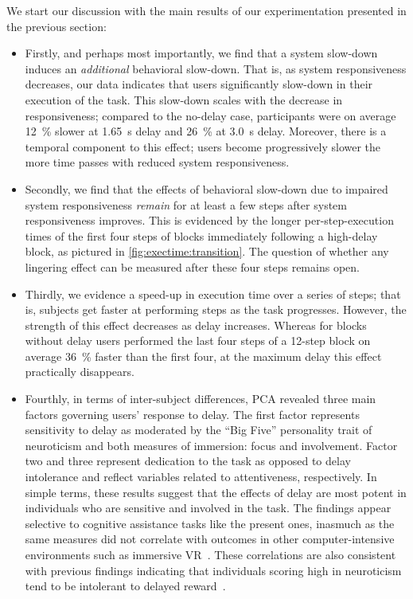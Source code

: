 We start our discussion with the main results of our experimentation presented in the previous section:

\begin{itemize}
  \item Firstly, and perhaps most importantly, we find that a system slow-down induces an \textit{additional} behavioral slow-down.
  That is, as system responsiveness decreases, our data indicates that users significantly slow-down in their execution of the task.
  This slow-down scales with the decrease in responsiveness; compared to the no-delay case, participants were on average \SI{12}{\percent} slower at \SI{1.65}{\second} delay and \SI{26}{\percent} at \SI{3.0}{\second} delay.
  Moreover, there is a temporal component to this effect; users become progressively slower the more time passes with reduced system responsiveness.

  \item Secondly, we find that the effects of behavioral slow-down due to impaired system responsiveness \emph{remain} for at least a few steps after system responsiveness improves.
  This is evidenced by the longer per-step-execution times of the first four steps of blocks immediately following a high-delay block, as pictured in \cref{fig:exectime:transition}.
  The question of whether any lingering effect can be measured after these four steps remains open.

  \item Thirdly, we evidence a speed-up in execution time over a series of steps; that is, subjects get faster at performing steps as the task progresses.
  However, the strength of this effect decreases as delay increases.
  Whereas for blocks without delay users performed the last four steps of a 12-step block on average \SI{36}{\percent} faster than the first four, at the maximum delay this effect practically disappears.

  \item Fourthly, in terms of inter-subject differences, PCA revealed three main factors governing users' response to delay. 
  The first factor represents sensitivity to delay as moderated by the ``Big Five'' personality trait of neuroticism and both measures of immersion: focus and involvement.
  Factor two and three represent dedication to the task as opposed to delay intolerance and reflect variables related to attentiveness, respectively.
  In simple terms, these results suggest that the effects of delay are most potent in individuals who are sensitive and involved in the task.
  The findings appear selective to cognitive assistance tasks like the present ones, inasmuch as the same measures did not correlate with outcomes in other computer-intensive environments such as immersive VR~\cite{quesnel2018you}.
  These correlations are also consistent with previous findings indicating that individuals scoring high in neuroticism tend to be intolerant to delayed reward~\cite{hirsh2008delay}.
\end{itemize}

